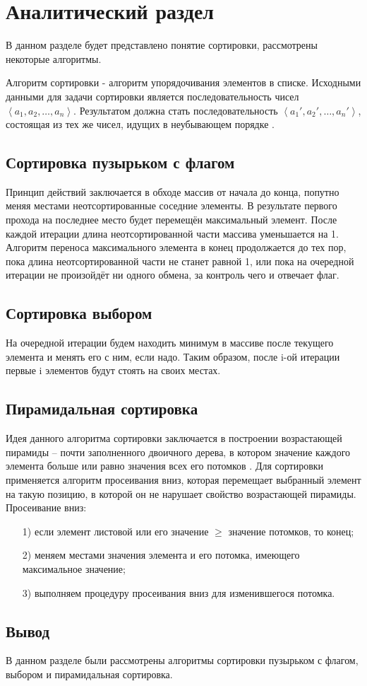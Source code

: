 \chapter{Аналитический раздел}
\label{cha:analysis}
В данном разделе будет представлено понятие сортировки, рассмотрены некоторые алгоритмы.

Алгоритм сортировки - алгоритм упорядочивания элементов в списке. Исходными данными для задачи сортировки является последовательность чисел $\left\langle a_1,a_2,\dots,a_n \right\rangle$. Результатом должна стать последовательность $\left\langle a_1',a_2',\dots,a_n' \right\rangle$, состоящая из тех же чисел, идущих в неубывающем порядке \cite{Cormen}. 

\section{Сортировка пузырьком с флагом}
Принцип действий заключается в обходе массив от начала до конца, попутно меняя местами неотсортированные соседние элементы. В результате первого прохода на последнее место будет перемещён максимальный элемент. После каждой итерации длина неотсортированной части массива уменьшается на 1. Алгоритм переноса максимального элемента в конец продолжается до тех пор, пока длина неотсортированной части не станет равной 1, или пока на очередной итерации не произойдёт ни одного обмена, за контроль чего и отвечает флаг.

\section{Сортировка выбором}
На очередной итерации будем находить минимум в массиве после текущего элемента и менять его с ним, если надо. Таким образом, после i-ой итерации первые i элементов будут стоять на своих местах.

\section{Пирамидальная сортировка}
Идея данного алгоритма сортировки заключается в построении возрастающей пирамиды -- почти заполненного двоичного дерева, в котором значение каждого элемента больше или равно значения всех его потомков \cite{archive}. Для сортировки применяется алгоритм просеивания вниз, которая перемещает выбранный элемент на такую позицию, в которой он не нарушает свойство возрастающей пирамиды. Просеивание вниз:
\begin{enumerate}
	\item[1)] если элемент листовой или его значение $\geq$ значение потомков, то конец;
	\item[2)] меняем местами значения элемента и его потомка, имеющего максимальное значение;
	\item[3)] выполняем процедуру просеивания вниз для изменившегося потомка. 
\end{enumerate}
\section{Вывод}
В данном разделе были рассмотрены алгоритмы сортировки пузырьком с флагом, выбором и пирамидальная сортировка.